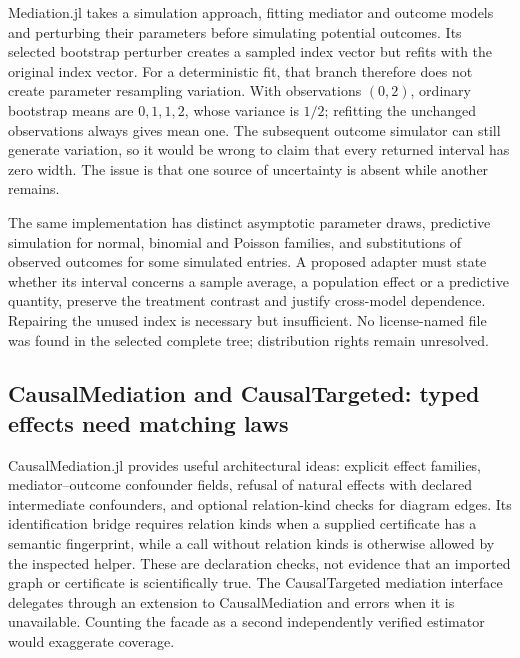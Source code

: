 Mediation.jl takes a simulation approach, fitting mediator and outcome models and
perturbing their parameters before simulating potential outcomes. Its selected
bootstrap perturber creates a sampled index vector but refits with the original
index vector. For a deterministic fit, that branch therefore does not create
parameter resampling variation. With observations $(0,2)$, ordinary bootstrap
means are $0,1,1,2$, whose variance is $1/2$; refitting the unchanged observations
always gives mean one. The subsequent outcome simulator can still generate
variation, so it would be wrong to claim that every returned interval has zero
width. The issue is that one source of uncertainty is absent while another
remains.\citep{exec25_omed_mediationjl,exec25_omed_choice}

The same implementation has distinct asymptotic parameter draws, predictive
simulation for normal, binomial and Poisson families, and substitutions of
observed outcomes for some simulated entries. A proposed adapter must state
whether its interval concerns a sample average, a population effect or a
predictive quantity, preserve the treatment contrast and justify cross-model
dependence. Repairing the unused index is necessary but insufficient. No
license-named file was found in the selected complete tree; distribution rights
remain unresolved.\citep{exec25_omed_mediationjl,exec25_omed_choice}

\subsection{CausalMediation and CausalTargeted: typed effects need matching laws}

CausalMediation.jl provides useful architectural ideas: explicit effect families,
mediator--outcome confounder fields, refusal of natural effects with declared
intermediate confounders, and optional relation-kind checks for diagram edges.
Its identification bridge requires relation kinds when a supplied certificate
has a semantic fingerprint, while a call without relation kinds is otherwise
allowed by the inspected helper. These are declaration checks, not evidence
that an imported graph or certificate is scientifically true. The CausalTargeted
mediation interface delegates through an extension to CausalMediation and errors
when it is unavailable. Counting the facade as a second independently verified
estimator would exaggerate coverage.\citep{exec25_omed_causalmediation,exec25_omed_targeted}

